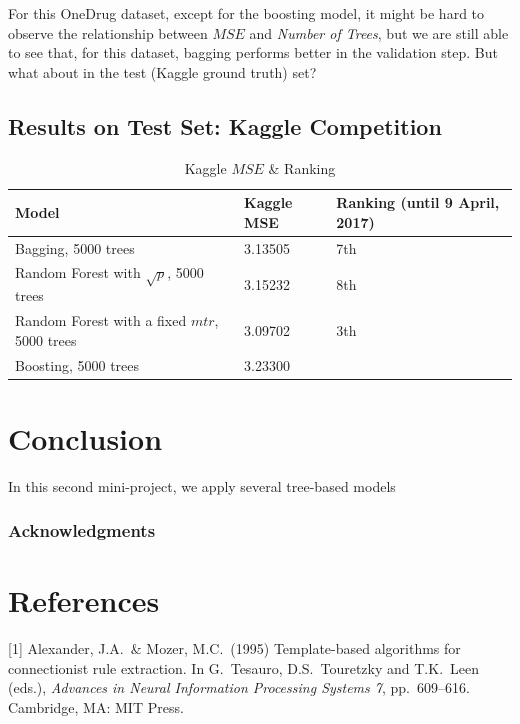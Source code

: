 \documentclass{article}
\begin{document}
For this OneDrug dataset, except for the boosting model, it might be hard to observe the relationship between $MSE$ and \textit{Number of Trees}, but we are still able to see that, for this dataset, bagging performs better in the validation step. But what about in the test (Kaggle ground truth) set?

\clearpage
\subsection{Results on Test Set: Kaggle Competition}
\begin{table}[h!]
	\centering
	\caption{Kaggle $MSE$ \& Ranking}
	\label{my-label}
	\begin{tabular}{|l|l|l|}
		\hline
		Model                                                & Kaggle MSE & Ranking (until 9 April, 2017) \\ \hline
		Bagging, 5000 trees                                  & 3.13505    & 7th                           \\ \hline
		Random Forest with $\sqrt{p}$, 5000 trees & 3.15232    & 8th                           \\ \hline
		Random Forest with a fixed $mtr$, 5000 trees           & 3.09702    & 3th                           \\ \hline
		Boosting, 5000 trees                                 & 3.23300    &                               \\ \hline
	\end{tabular}
\end{table}

\section{Conclusion}
\label{con}
In this second mini-project, we apply several tree-based models 

\subsubsection*{Acknowledgments}
\section*{References}
\small
[1] Alexander, J.A.\ \& Mozer, M.C.\ (1995) Template-based algorithms
for connectionist rule extraction. In G.\ Tesauro, D.S.\ Touretzky and
T.K.\ Leen (eds.), {\it Advances in Neural Information Processing
  Systems 7}, pp.\ 609--616. Cambridge, MA: MIT Press.
\end{document}
